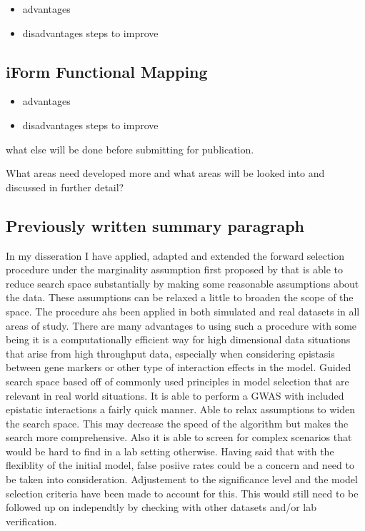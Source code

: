 \documentclass[11pt,]{book}
\providecommand{\tightlist}{%
  \setlength{\itemsep}{0pt}\setlength{\parskip}{0pt}}
\theoremstyle{definition}
\theoremstyle{definition}
\theoremstyle{remark}
\begin{document}
\begin{itemize}
\tightlist
\item
  advantages
\item
  disadvantages steps to improve
\end{itemize}

\subsection{iForm Functional Mapping}\label{iform-functional-mapping}

\begin{itemize}
\tightlist
\item
  advantages
\item
  disadvantages steps to improve
\end{itemize}

what else will be done before submitting for publication.

What areas need developed more and what areas will be looked into and
discussed in further detail?

\subsection{Previously written summary
paragraph}\label{previously-written-summary-paragraph}

In my disseration I have applied, adapted and extended the forward
selection procedure under the marginality assumption first proposed by
\cite{hao2014interaction} that is able to reduce search space
substantially by making some reasonable assumptions about the data.
These assumptions can be relaxed a little to broaden the scope of the
space. The procedure ahs been applied in both simulated and real
datasets in all areas of study. There are many advantages to using such
a procedure with some being it is a computationally efficient way for
high dimensional data situations that arise from high throughput data,
especially when considering epistasis between gene markers or other type
of interaction effects in the model. Guided search space based off of
commonly used principles in model selection that are relevant in real
world situations. It is able to perform a GWAS with included epistatic
interactions a fairly quick manner. Able to relax assumptions to widen
the search space. This may decrease the speed of the algorithm but makes
the search more comprehensive. Also it is able to screen for complex
scenarios that would be hard to find in a lab setting otherwise. Having
said that with the flexiblity of the initial model, false posiive rates
could be a concern and need to be taken into consideration. Adjustement
to the significance level and the model selection criteria have been
made to account for this. This would still need to be followed up on
independtly by checking with other datasets and/or lab verification.
\end{document}
